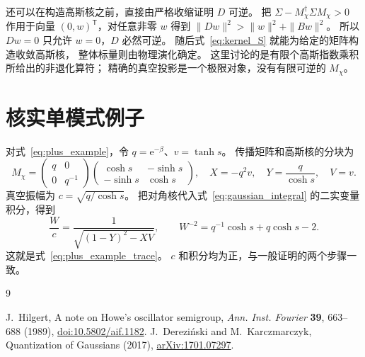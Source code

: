 \documentclass[UTF8,11pt,a4paper,fontset=fandol]{ctexart}
\newcommand{\ee}{\mathrm e}
\newcommand{\trans}{\mathsf T}
\numberwithin{equation}{section}
\begin{document}
还可以在构造高斯核之前，直接由严格收缩证明 $D$ 可逆。
把 $\Sigma-M_\chi^\dagger\Sigma M_\chi>0$
作用于向量 $(0,w)^\trans$，对任意非零 $w$ 得到
$\|Dw\|^2>\|w\|^2+\|Bw\|^2$。
所以 $Dw=0$ 只允许 $w=0$，$D$ 必然可逆。
随后式~\eqref{eq:kernel_S} 就能为给定的矩阵构造收敛高斯核，
整体标量则由物理演化确定。
这里讨论的是有限个高斯指数乘积所给出的非退化算符；
精确的真空投影是一个极限对象，没有有限可逆的 $M_\chi$。

\section{核实单模式例子}

对式~\eqref{eq:plus_example}，令 $q=\ee^{-\beta}$、$v=\tanh s$。
传播矩阵和高斯核的分块为
\begin{equation}
 M_\chi=
 \begin{pmatrix}q&0\\0&q^{-1}\end{pmatrix}
 \begin{pmatrix}\cosh s&-\sinh s\\-\sinh s&\cosh s\end{pmatrix},
 \quad X=-q^2v,\quad Y=\frac{q}{\cosh s},\quad V=v.
\end{equation}
真空振幅为 $c=\sqrt{q/\cosh s}$。
把对角核代入式~\eqref{eq:gaussian_integral} 的二实变量积分，得到
\begin{equation}
 \frac{W}{c}=\frac{1}{\sqrt{(1-Y)^2-XV}},
 \qquad
 W^{-2}=q^{-1}\cosh s+q\cosh s-2.
\end{equation}
这就是式~\eqref{eq:plus_example_trace}。
$c$ 和积分均为正，与一般证明的两个步骤一致。

\begin{thebibliography}{9}
\raggedright
{}
J.~Hilgert, A note on Howe's oscillator semigroup,
\emph{Ann. Inst. Fourier} \textbf{39}, 663--688 (1989),
\href{https://doi.org/10.5802/aif.1182}{doi:10.5802/aif.1182}.
J.~Derezi\'nski and M.~Karczmarczyk, Quantization of Gaussians (2017),
\href{https://arxiv.org/abs/1701.07297}{arXiv:1701.07297}.
\end{thebibliography}
\end{document}
